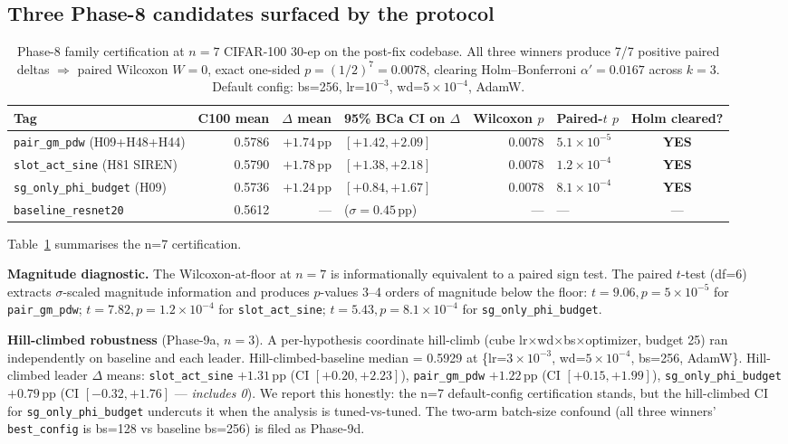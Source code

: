 \documentclass{article}
\begin{document}
\subsection{Three Phase-8 candidates surfaced by the protocol}
\label{sec:phase-8}

\begin{table}[t]
\small\centering
\caption{Phase-8 family certification at $n{=}7$ CIFAR-100 30-ep on
the post-fix codebase. All three winners produce 7/7 positive paired
deltas $\Rightarrow$ paired Wilcoxon $W{=}0$, exact one-sided
$p=(1/2)^7=0.0078$, clearing Holm--Bonferroni
$\alpha'{=}0.0167$ across $k{=}3$. Default config: bs=256, lr=$10^{-3}$,
wd=$5{\times}10^{-4}$, AdamW.}
\label{tab:phase-8}
\begin{tabular}{l rrl rl c}
\toprule
Tag & C100 mean & $\Delta$ mean & 95\% BCa CI on $\Delta$ & Wilcoxon $p$ & Paired-$t$ $p$ & Holm cleared? \\
\midrule
\texttt{pair\_gm\_pdw} (H09+H48+H44)   & 0.5786 & $+1.74$\,pp & $[+1.42, +2.09]$ & 0.0078 & $5.1{\times}10^{-5}$ & \textbf{YES} \\
\texttt{slot\_act\_sine} (H81 SIREN)   & 0.5790 & $+1.78$\,pp & $[+1.38, +2.18]$ & 0.0078 & $1.2{\times}10^{-4}$ & \textbf{YES} \\
\texttt{sg\_only\_phi\_budget} (H09)   & 0.5736 & $+1.24$\,pp & $[+0.84, +1.67]$ & 0.0078 & $8.1{\times}10^{-4}$ & \textbf{YES} \\
\texttt{baseline\_resnet20}            & 0.5612 & ---         & ($\sigma{=}0.45$\,pp) & --- & --- & --- \\
\bottomrule
\end{tabular}
\end{table}

Table~\ref{tab:phase-8} summarises the n=7 certification.

\textbf{Magnitude diagnostic.} The Wilcoxon-at-floor at $n{=}7$ is
informationally equivalent to a paired sign test. The paired
$t$-test (df=6) extracts $\sigma$-scaled magnitude information and
produces $p$-values 3--4 orders of magnitude below the floor:
$t=9.06, p=5{\times}10^{-5}$ for \texttt{pair\_gm\_pdw};
$t=7.82, p=1.2{\times}10^{-4}$ for \texttt{slot\_act\_sine};
$t=5.43, p=8.1{\times}10^{-4}$ for \texttt{sg\_only\_phi\_budget}.

\textbf{Hill-climbed robustness} (Phase-9a, $n{=}3$). A per-hypothesis
coordinate hill-climb (cube lr$\times$wd$\times$bs$\times$optimizer,
budget 25) ran independently on baseline and each leader.
Hill-climbed-baseline median = 0.5929 at \{lr=$3{\times}10^{-3}$,
wd=$5{\times}10^{-4}$, bs=256, AdamW\}. Hill-climbed leader $\Delta$
means: \texttt{slot\_act\_sine} $+1.31$\,pp (CI $[+0.20, +2.23]$),
\texttt{pair\_gm\_pdw} $+1.22$\,pp (CI $[+0.15, +1.99]$),
\texttt{sg\_only\_phi\_budget} $+0.79$\,pp (CI
$\mathbf{[-0.32, +1.76]}$ --- \emph{includes 0}). We report this
honestly: the n=7 default-config certification stands, but the
hill-climbed CI for \texttt{sg\_only\_phi\_budget} undercuts it when
the analysis is tuned-vs-tuned. The two-arm batch-size confound (all
three winners' \texttt{best\_config} is bs=128 vs baseline bs=256)
is filed as Phase-9d.
\end{document}
